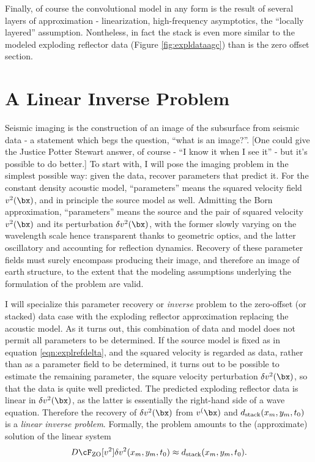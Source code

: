 
Finally, of course the convolutional model in any form is the result of several layers of approximation - linearization, high-frequency asymptotics, the ``locally layered'' assumption. Nontheless, in fact the stack is even more similar to the modeled exploding reflector data (Figure \ref{fig:expldataagc}) than is the zero offset section.

\section{A Linear Inverse Problem}
Seismic imaging is the construction of an image of the subsurface from seismic data - a statement which begs the question, ``what is an image?''. [One could give the Justice Potter Stewart answer, of course - ``I know it when I see it'' - but it's possible to do better.] To start with, I will pose the imaging problem in the simplest possible way: given the data, recover parameters that predict it. For the constant density acoustic model, ``parameters'' means the squared velocity field $v^2(\bx)$, and in principle the source model as well. Admitting the Born approximation, ``parameters'' means the source and the pair of squared velocity $v^2(\bx)$ and its perturbation $\delta v^2(\bx)$, with the former slowly varying on the wavelength scale hence transparent thanks to geometric optics, and the latter oscillatory and accounting for reflection dynamics. Recovery of these parameter fields must surely encompass producing their image, and therefore an image of earth structure, to the extent that the modeling assumptions underlying the formulation of the problem are valid.

I will specialize this parameter recovery or {\em inverse} problem to the zero-offset (or stacked) data case with the exploding reflector approximation replacing the acoustic model. As it turns out, this combination of data and model does not permit all parameters to be determined. If the source model is fixed as in equation \ref{eqn:explrefdelta}, and the squared velocity is regarded as data, rather than as a parameter field to be determined, it turns out to be possible to estimate the remaining parameter, the square velocity perturbation $\delta v^2(\bx)$, so that the data is quite well predicted. The predicted exploding reflector data is linear in $\delta v^2(\bx)$, as the latter is essentially the right-hand side of a wave equation. Therefore the recovery of $\delta v^2(\bx)$ from $v^(\bx)$ and $d_{\rm stack}(x_m,y_m,t_0)$ is a {\em linear inverse problem}. Formally, the problem amounts to the (approximate) solution of the linear system
\begin{equation}
\label{eqn:psinv}
D\cF_{\rm ZO}[v^2]\delta v^2(x_m,y_m,t_0) \approx  d_{\rm stack}(x_m,y_m,t_0). 
\end{equation}

